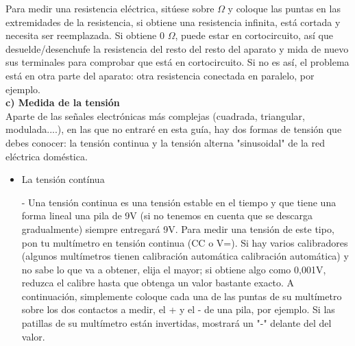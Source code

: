 \documentclass[a5paper,twoside,openany]{book}
\newenvironment{normalize}{\leftskip-\leftmargin}{\par}
\begin{document}
Para medir una resistencia eléctrica, sitúese sobre $\Omega$ y coloque las puntas en las extremidades de la resistencia, si obtiene una resistencia infinita, está cortada y necesita ser reemplazada.
Si obtiene 0 $\Omega$, puede estar en cortocircuito, así que desuelde/desenchufe la resistencia del resto del resto del aparato y mida de nuevo sus terminales para comprobar que está en cortocircuito. Si no es así, el problema está en otra parte del aparato: otra resistencia conectada en paralelo, por ejemplo.\\

\textbf{
c) Medida de la tensión}\\
Aparte de las señales electrónicas más complejas (cuadrada, triangular, modulada....), en las que no entraré en esta guía, hay dos formas de tensión que debes conocer: la tensión continua y la tensión alterna "sinusoidal" de la red eléctrica doméstica.

\begin{itemize}
\item La tensión contínua

\begin{normalize}
Una tensión continua es una tensión estable en el tiempo y que tiene una forma lineal
una pila de 9V (si no tenemos en cuenta que se descarga gradualmente) siempre entregará 9V. 
Para medir una tensión de este tipo, pon tu multímetro en tensión continua
(CC o V=). Si hay varios calibradores (algunos multímetros tienen calibración automática
calibración automática) y no sabe lo que va a obtener, elija el mayor; si obtiene algo como 0,001V, reduzca el calibre hasta que obtenga un valor bastante exacto.
A continuación, simplemente coloque cada una de las puntas de su multímetro sobre los dos contactos a medir, el + y el - de una pila, por ejemplo.
Si las patillas de su multímetro están invertidas, mostrará un "-" delante del
del valor.
\end{normalize}
\end{itemize}
\end{document}
